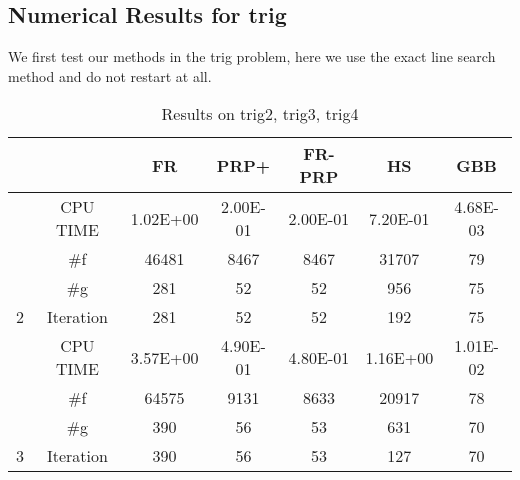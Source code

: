 \documentclass{article}
\begin{document}
\subsection{Numerical Results for trig}
We first test our methods in the trig problem, here we use the exact line search method and do not restart at all.
	\begin{table}[H]
		\caption{Results on trig2, trig3, trig4}
		\centering
		\begin{tabular}{|c|c|c|c|c|c|c|}
			\hline
			&           & FR                              & PRP+                            & FR-PRP                          & HS                              & GBB                             \\ \hline
			& CPU TIME  & {\color[HTML]{000000} 1.02E+00} & {\color[HTML]{000000} 2.00E-01} & {\color[HTML]{000000} 2.00E-01} & {\color[HTML]{000000} 7.20E-01} & {\color[HTML]{000000} 4.68E-03} \\ \cline{2-7} 
			& \#f       & {\color[HTML]{000000} 46481}    & {\color[HTML]{000000} 8467}     & {\color[HTML]{000000} 8467}     & {\color[HTML]{000000} 31707}    & {\color[HTML]{000000} 79}       \\ \cline{2-7} 
			& \#g       & {\color[HTML]{000000} 281}      & {\color[HTML]{000000} 52}       & {\color[HTML]{000000} 52}       & {\color[HTML]{000000} 956}      & {\color[HTML]{000000} 75}       \\ \cline{2-7} 
			\multirow{-4}{*}{2} & Iteration & {\color[HTML]{000000} 281}      & {\color[HTML]{000000} 52}       & {\color[HTML]{000000} 52}       & {\color[HTML]{000000} 192}      & {\color[HTML]{000000} 75}       \\ \hline
			& CPU TIME  & {\color[HTML]{000000} 3.57E+00} & {\color[HTML]{000000} 4.90E-01} & {\color[HTML]{000000} 4.80E-01} & {\color[HTML]{000000} 1.16E+00} & {\color[HTML]{000000} 1.01E-02} \\ \cline{2-7} 
			& \#f       & {\color[HTML]{000000} 64575}    & {\color[HTML]{000000} 9131}     & {\color[HTML]{000000} 8633}     & {\color[HTML]{000000} 20917}    & {\color[HTML]{000000} 78}       \\ \cline{2-7} 
			& \#g       & {\color[HTML]{000000} 390}      & {\color[HTML]{000000} 56}       & {\color[HTML]{000000} 53}       & {\color[HTML]{000000} 631}      & {\color[HTML]{000000} 70}       \\ \cline{2-7} 
			\multirow{-4}{*}{3} & Iteration & {\color[HTML]{000000} 390}      & {\color[HTML]{000000} 56}       & {\color[HTML]{000000} 53}       & {\color[HTML]{000000} 127}      & {\color[HTML]{000000} 70}       \\ \hline

\end{tabular}
\end{table}
\end{document}
